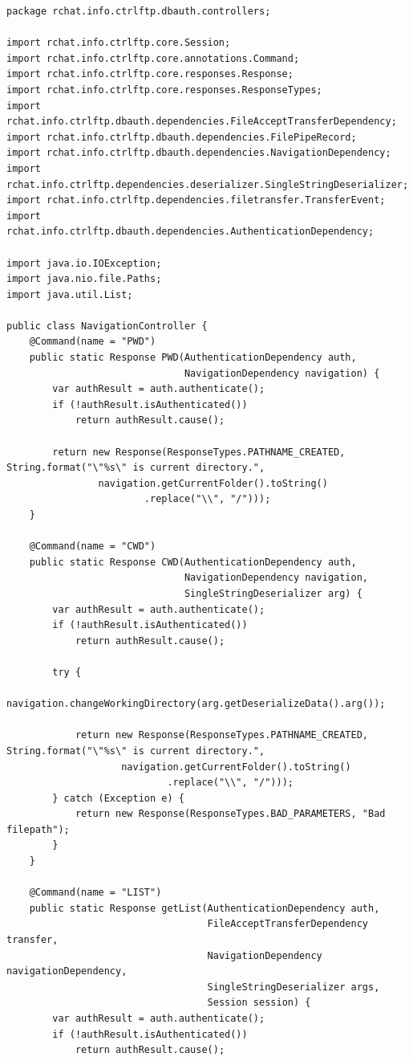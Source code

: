 \documentclass[a4paper,14pt]{extarticle}
\begin{document}
\begin{verbatim}
package rchat.info.ctrlftp.dbauth.controllers;

import rchat.info.ctrlftp.core.Session;
import rchat.info.ctrlftp.core.annotations.Command;
import rchat.info.ctrlftp.core.responses.Response;
import rchat.info.ctrlftp.core.responses.ResponseTypes;
import rchat.info.ctrlftp.dbauth.dependencies.FileAcceptTransferDependency;
import rchat.info.ctrlftp.dbauth.dependencies.FilePipeRecord;
import rchat.info.ctrlftp.dbauth.dependencies.NavigationDependency;
import rchat.info.ctrlftp.dependencies.deserializer.SingleStringDeserializer;
import rchat.info.ctrlftp.dependencies.filetransfer.TransferEvent;
import rchat.info.ctrlftp.dbauth.dependencies.AuthenticationDependency;

import java.io.IOException;
import java.nio.file.Paths;
import java.util.List;

public class NavigationController {
    @Command(name = "PWD")
    public static Response PWD(AuthenticationDependency auth,
                               NavigationDependency navigation) {
        var authResult = auth.authenticate();
        if (!authResult.isAuthenticated())
            return authResult.cause();

        return new Response(ResponseTypes.PATHNAME_CREATED, String.format("\"%s\" is current directory.",
                navigation.getCurrentFolder().toString()
                        .replace("\\", "/")));
    }

    @Command(name = "CWD")
    public static Response CWD(AuthenticationDependency auth,
                               NavigationDependency navigation,
                               SingleStringDeserializer arg) {
        var authResult = auth.authenticate();
        if (!authResult.isAuthenticated())
            return authResult.cause();

        try {
            navigation.changeWorkingDirectory(arg.getDeserializeData().arg());

            return new Response(ResponseTypes.PATHNAME_CREATED, String.format("\"%s\" is current directory.",
                    navigation.getCurrentFolder().toString()
                            .replace("\\", "/")));
        } catch (Exception e) {
            return new Response(ResponseTypes.BAD_PARAMETERS, "Bad filepath");
        }
    }

    @Command(name = "LIST")
    public static Response getList(AuthenticationDependency auth,
                                   FileAcceptTransferDependency transfer,
                                   NavigationDependency navigationDependency,
                                   SingleStringDeserializer args,
                                   Session session) {
        var authResult = auth.authenticate();
        if (!authResult.isAuthenticated())
            return authResult.cause();


\end{verbatim}
\end{document}
